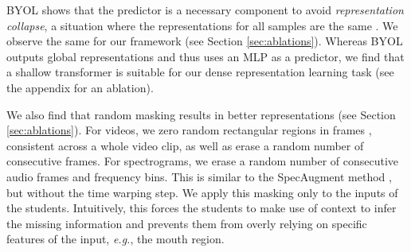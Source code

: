 \documentclass[10pt,twocolumn,letterpaper]{article}
\begin{document}
\begin{description}[wide,itemindent=\labelsep]
\item[Transformer as predictor.] BYOL shows that the predictor is a necessary component to avoid \textit{representation collapse}, a situation where the representations for all samples are the same \cite{grill2020bootstrap}. We observe the same for our framework (see Section \ref{sec:ablations}). Whereas BYOL outputs global representations and thus uses an MLP as a predictor, we find that a shallow transformer is suitable for our dense representation learning task (see the appendix for an ablation).  

\item[Random masking.] We also find that random masking results in better representations (see Section \ref{sec:ablations}). For videos, we zero random rectangular regions in frames \cite{zhong2020random}, consistent across a whole video clip, as well as erase a random number of consecutive frames. For spectrograms, we erase a random number of consecutive audio frames and frequency bins. This is similar to the SpecAugment method \cite{park2019specaugment}, but without the time warping step. We apply this masking only to the inputs of the students. Intuitively, this forces the students to make use of context to infer the missing information and prevents them from overly relying on specific features of the input, \textit{e.g.}, the mouth region.


\end{description}
\end{document}
